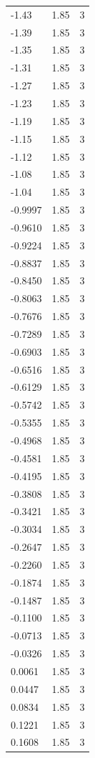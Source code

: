 \begin{longtable}{lrr}
  -1.43 & 1.85 & 3 \\
  -1.39 & 1.85 & 3 \\
  -1.35 & 1.85 & 3 \\
  -1.31 & 1.85 & 3 \\
  -1.27 & 1.85 & 3 \\
  -1.23 & 1.85 & 3 \\
  -1.19 & 1.85 & 3 \\
  -1.15 & 1.85 & 3 \\
  -1.12 & 1.85 & 3 \\
  -1.08 & 1.85 & 3 \\
  -1.04 & 1.85 & 3 \\
  -0.9997 & 1.85 & 3 \\
  -0.9610 & 1.85 & 3 \\
  -0.9224 & 1.85 & 3 \\
  -0.8837 & 1.85 & 3 \\
  -0.8450 & 1.85 & 3 \\
  -0.8063 & 1.85 & 3 \\
  -0.7676 & 1.85 & 3 \\
  -0.7289 & 1.85 & 3 \\
  -0.6903 & 1.85 & 3 \\
  -0.6516 & 1.85 & 3 \\
  -0.6129 & 1.85 & 3 \\
  -0.5742 & 1.85 & 3 \\
  -0.5355 & 1.85 & 3 \\
  -0.4968 & 1.85 & 3 \\
  -0.4581 & 1.85 & 3 \\
  -0.4195 & 1.85 & 3 \\
  -0.3808 & 1.85 & 3 \\
  -0.3421 & 1.85 & 3 \\
  -0.3034 & 1.85 & 3 \\
  -0.2647 & 1.85 & 3 \\
  -0.2260 & 1.85 & 3 \\
  -0.1874 & 1.85 & 3 \\
  -0.1487 & 1.85 & 3 \\
  -0.1100 & 1.85 & 3 \\
  -0.0713 & 1.85 & 3 \\
  -0.0326 & 1.85 & 3 \\
  0.0061 & 1.85 & 3 \\
  0.0447 & 1.85 & 3 \\
  0.0834 & 1.85 & 3 \\
  0.1221 & 1.85 & 3 \\
  0.1608 & 1.85 & 3 \\

\end{longtable}
